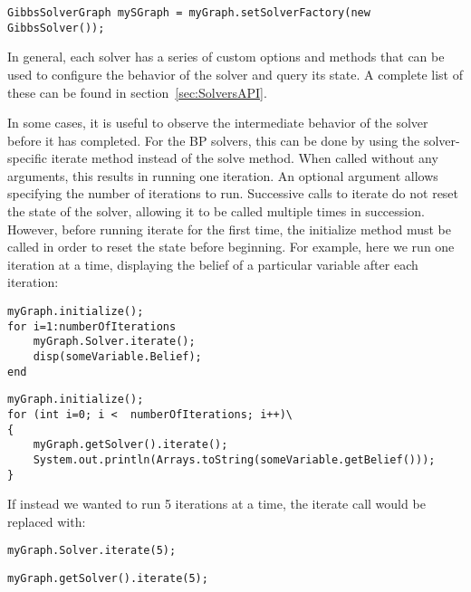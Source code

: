 \begin{lstlisting}
GibbsSolverGraph mySGraph = myGraph.setSolverFactory(new GibbsSolver());
\end{lstlisting}
\fi

In general, each solver has a series of custom options and methods that can be used to configure the behavior of the solver and query its state.  A complete list of these can be found in section~\ref{sec:SolversAPI}.

In some cases, it is useful to observe the intermediate behavior of the solver before it has completed.  For the BP solvers, this can be done by using the solver-specific iterate method instead of the solve method.  When called without any arguments, this results in running one iteration.  An optional argument allows specifying the number of iterations to run.  Successive calls to iterate do not reset the state of the solver, allowing it to be called multiple times in succession.  However, before running iterate for the first time, the initialize method must be called in order to reset the state before beginning.  For example, here we run one iteration at a time, displaying the belief of a particular variable after each iteration:

\ifmatlab

\begin{lstlisting}
myGraph.initialize();
for i=1:numberOfIterations
	myGraph.Solver.iterate();
	disp(someVariable.Belief);
end
\end{lstlisting}

\fi

\ifjava

\begin{lstlisting}
myGraph.initialize();
for (int i=0; i <  numberOfIterations; i++)\
{
	myGraph.getSolver().iterate();
	System.out.println(Arrays.toString(someVariable.getBelief()));
}
\end{lstlisting}

\fi

If instead we wanted to run 5 iterations at a time, the iterate call would be replaced with:

\ifmatlab

\begin{lstlisting}
myGraph.Solver.iterate(5);
\end{lstlisting}

\fi

\ifjava
\begin{lstlisting}
myGraph.getSolver().iterate(5);
\end{lstlisting}

